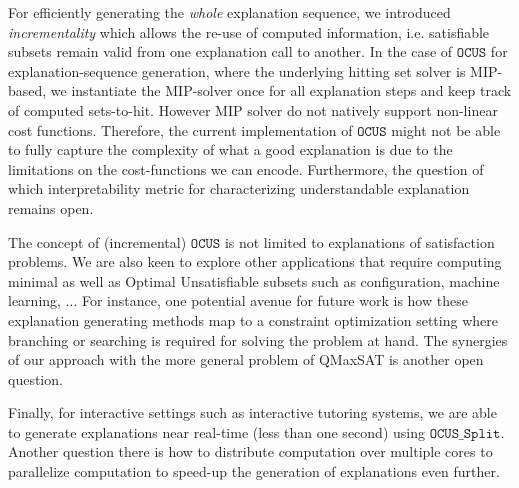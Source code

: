 \documentclass[twoside,11pt]{article}
\newcommand\comment[1]{\marginpar{\tiny #1}}
\renewcommand\comment[1]{#1}
\newcommand{\emilio}[1]{{\comment{\color{red}Emilio: #1}}}
\newcommand\mm[1]{\ensuremath{#1}\xspace}
\newcommand\call[1]{\mm{\texttt{#1}}}
\newcommand\comus{\mm{\call{OCUS}}}
\newcommand{\comussplit}{\mm{\call{OCUS\_Split}}}
\newcommand\corrsubsets{\mm{\call{CorrSubsets}}}
\begin{document}
For efficiently generating the \emph{whole} explanation sequence, we introduced \emph{incrementality} which allows the re-use of computed information, i.e. satisfiable subsets remain valid from one explanation call to another.
In the case of \comus for explanation-sequence generation, where the underlying hitting set solver is MIP-based, we instantiate the MIP-solver once for all explanation steps and keep track of computed sets-to-hit.
However MIP solver do not natively support non-linear cost functions. Therefore, the current implementation of \comus might not be able to fully capture the complexity of what a good explanation is due to the limitations on the cost-functions we can encode.
Furthermore, the question of which interpretability metric for characterizing understandable explanation remains open.  

The concept of (incremental) \comus is not limited to explanations of satisfaction problems. We are also keen to explore other applications that require computing minimal as well as Optimal Unsatisfiable subsets such as configuration, machine learning, ...
For instance, one potential avenue for future work is how these explanation generating methods map to a constraint optimization setting where branching or searching is required for solving the problem at hand. 
The synergies of our approach with the more general problem of QMaxSAT \cite{DBLP:journals/constraints/IgnatievJM16} is another open question. 

Finally, for interactive settings such as interactive tutoring systems, we are able to generate explanations near real-time (less than one second) using \comussplit. Another question there is how to distribute computation over multiple cores to parallelize computation to speed-up the generation of explanations even further.


\end{document}
